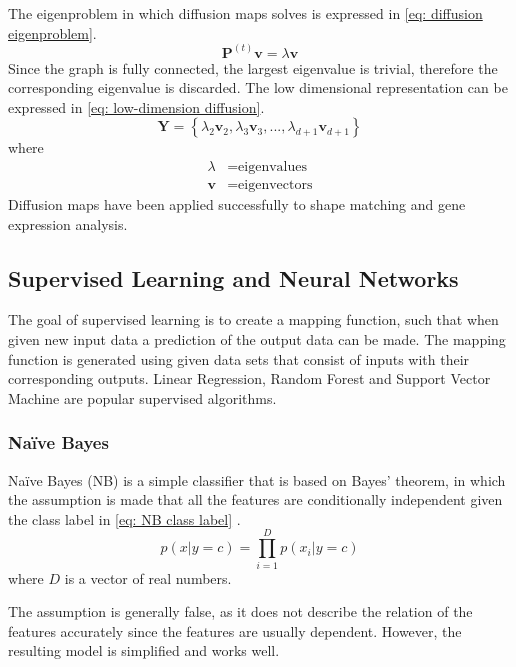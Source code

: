 \documentclass[11pt]{article}
\begin{document}
	The eigenproblem in which diffusion maps solves is expressed in \eqref{eq: diffusion eigenproblem}. 
	\begin{equation}
		\textbf{P}^{(t)}\textbf{v} = \lambda\textbf{v}
		\label{eq: diffusion eigenproblem}
	\end{equation}
	Since the graph is fully connected, the largest eigenvalue is trivial, therefore the corresponding eigenvalue is discarded. The low dimensional representation can be expressed in \eqref{eq: low-dimension diffusion}.
	\begin{equation}
		\textbf{Y} = \left\{\lambda_2\textbf{v}_2, \lambda_3\textbf{v}_3,...,\lambda_{d+1}\textbf{v}_{d+1} \right\}
		\label{eq: low-dimension diffusion}
	\end{equation}
	where
	\vspace{-3mm}
	\begin{align*}
		\lambda &= \text{eigenvalues}\\
		\textbf{v} &= \text{eigenvectors}
	\end{align*}
	Diffusion maps have been applied successfully to shape matching and gene expression analysis.
	
	\subsection{Supervised Learning and Neural Networks}
	The goal of supervised learning is to create a mapping function, such that when given new input data a prediction of the output data can be made. The mapping function is generated using given data sets that consist of inputs with their corresponding outputs. Linear Regression, Random Forest and Support Vector Machine are popular supervised algorithms.
	
	\subsubsection{Na\"{i}ve Bayes}
	Na\"{i}ve Bayes (NB) is a simple classifier that is based on Bayes' theorem, in which the assumption is made that all the features are conditionally independent given the class label in \eqref{eq: NB class label} \cite{Murphy2006}. 
	\begin{equation}
		\label{eq: NB class label}
		p(x | y = c) = \prod_{i = 1}^{D}p(x_i | y = c)
	\end{equation}
	where $D$ is a vector of real numbers.
	
	The assumption is generally false, as it does not describe the relation of the features accurately since the features are usually dependent. However, the resulting model is simplified and works well.
	
\end{document}
